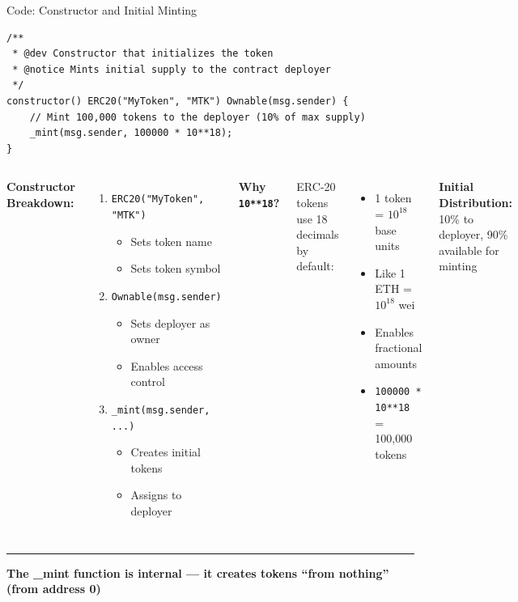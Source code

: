 \documentclass[8pt,aspectratio=169]{beamer}
\newcommand{\bottomnote}[1]{%
\vfill
\vspace{-2mm}
\textcolor{mllavender2}{\rule{\textwidth}{0.4pt}}
\vspace{1mm}
\footnotesize
\textbf{#1}
}
\begin{document}
\begin{frame}[t,fragile]{Code: Constructor and Initial Minting}
\begin{lstlisting}[style=solidity]
/**
 * @dev Constructor that initializes the token
 * @notice Mints initial supply to the contract deployer
 */
constructor() ERC20("MyToken", "MTK") Ownable(msg.sender) {
    // Mint 100,000 tokens to the deployer (10% of max supply)
    _mint(msg.sender, 100000 * 10**18);
}
\end{lstlisting}

\vspace{0.5em}
\begin{columns}[T]
\textbf{Constructor Breakdown:}
\begin{enumerate}
\item \texttt{ERC20("MyToken", "MTK")}
\begin{itemize}
\item Sets token name
\item Sets token symbol
\end{itemize}
\item \texttt{Ownable(msg.sender)}
\begin{itemize}
\item Sets deployer as owner
\item Enables access control
\end{itemize}
\item \texttt{\_mint(msg.sender, ...)}
\begin{itemize}
\item Creates initial tokens
\item Assigns to deployer
\end{itemize}
\end{enumerate}

\textbf{Why \texttt{10**18}?}

ERC-20 tokens use 18 decimals by default:
\begin{itemize}
\item 1 token = $10^{18}$ base units
\item Like 1 ETH = $10^{18}$ wei
\item Enables fractional amounts
\item \texttt{100000 * 10**18} = 100,000 tokens
\end{itemize}

\vspace{0.3em}
\textbf{Initial Distribution:}\\
10\% to deployer, 90\% available for minting
\end{columns}

\bottomnote{The \_mint function is internal --- it creates tokens ``from nothing'' (from address 0)}
\end{frame}
\end{document}
